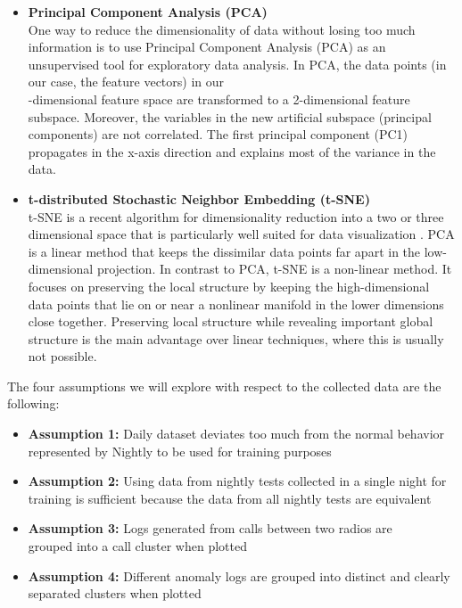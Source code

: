 \begin{itemize} 

\item \textbf{ Principal Component Analysis (PCA)} \\ One way to reduce the dimensionality of data without losing too much information is to use Principal Component Analysis (PCA) as an unsupervised tool for exploratory data analysis. In PCA, the data points (in our case, the feature vectors) in our\\ \featureVectorLength-dimensional feature space are transformed to a 2-dimensional feature subspace. Moreover, the variables in the new artificial subspace (principal components) are not correlated. The first principal component (PC1) propagates in the x-axis direction and explains most of the variance in the data.
    
   \item \textbf{ t-distributed Stochastic Neighbor Embedding (t-SNE)}\\ t-SNE is a recent algorithm for dimensionality reduction into a two or three dimensional space that is particularly well suited for data visualization \cite{tsne}. PCA is a linear method that keeps the dissimilar data points far apart in the low-dimensional projection. In contrast to PCA, t-SNE is a non-linear method. It focuses on preserving the local structure by keeping the high-dimensional data points that lie on or near a nonlinear manifold in the lower dimensions close together. Preserving local structure while revealing important global structure is the main advantage over linear techniques, where this is usually not possible.
    
\end{itemize}

The four assumptions we will explore with respect to the collected data are the following: 

\begin{itemize} 
    \item \textbf{Assumption 1:} Daily dataset deviates too much from the normal behavior represented by Nightly to be used for training purposes 
    \item \textbf{Assumption 2:} Using data from nightly tests collected in a single night for training is sufficient because the data from all nightly tests are equivalent 
    \item \textbf{Assumption 3:} Logs generated from calls between two radios are\\
    grouped into a call cluster when plotted 
    \item \textbf{Assumption 4:} Different anomaly logs are grouped into distinct and clearly separated clusters when plotted
\end{itemize}

